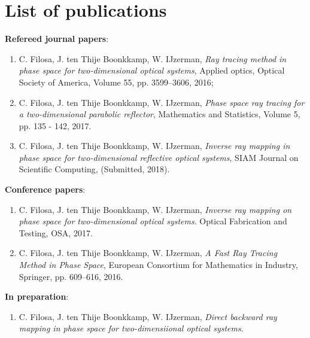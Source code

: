 
\chapter*{List of publications}
\noindent \textbf{Refereed journal papers}:
\begin{enumerate}
\item   C. Filosa, J. ten Thije Boonkkamp, W. IJzerman,
\emph{Ray tracing method in phase space for two-dimensional optical systems}, Applied optics, Optical Society of America,
  Volume 55, pp. 3599--3606, 2016;

\item  C. Filosa, J. ten Thije Boonkkamp, W. IJzerman, 
  \emph{Phase space ray tracing for a two-dimensional parabolic reflector},
Mathematics and Statistics, Volume 5, pp. 135 - 142, 2017.
\item  C. Filosa, J. ten Thije Boonkkamp, W. IJzerman, \emph{Inverse ray mapping in phase space for two-dimensional reflective optical systems}, SIAM Journal on Scientific Computing, (Submitted, 2018).
\end{enumerate}
\noindent \textbf{Conference papers}:
\begin{enumerate}
\item 
  C. Filosa, J. ten Thije Boonkkamp, W. IJzerman,  \emph{Inverse ray mapping on phase space for two-dimensional optical systems}.
  Optical Fabrication and Testing, OSA, 2017. 
\item  C. Filosa, J. ten Thije Boonkkamp, W. IJzerman, \emph{A Fast Ray Tracing Method in Phase Space}, European Consortium for Mathematics in Industry, Springer, pp. 609--616, 2016.
\end{enumerate}
\noindent \textbf{In preparation}:
\begin{enumerate}
\item  C. Filosa, J. ten Thije Boonkkamp, W. IJzerman, \emph{Direct backward ray mapping in phase space for two-dimensiional optical systems}.
\end{enumerate}
